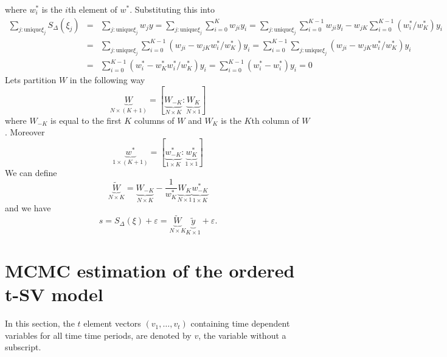 \documentclass[12pt]{article}
\begin{document}
where $w^{*}_{i}$ is the $i$th element of $w^{*}$. Substituting this into
\begin{eqnarray}
\sum \limits_{j : \text{unique} \xi_j} S_{\Delta}(\xi_j )&=&\sum \limits_{j : \text{unique} \xi_j} w_j y= \sum \limits_{j : \text{unique} \xi_j} \sum_{i=0}^{K} w_{ji}y_{i}  = \sum \limits_{j : \text{unique} \xi_j} \sum_{i=0}^{K-1} w_{ji}y_{i} -w_{jK} \sum \limits_{i=0}^{K-1} (w^{*}_{i}/w^{*}_{K})y_i \nonumber \\
&=&\sum \limits_{j : \text{unique} \xi_j} \sum_{i=0}^{K-1} (w_{ji}- w_{jK}w^{*}_{i}/w^{*}_{K})y_{i} =  \sum_{i=0}^{K-1} \sum \limits_{j : \text{unique} \xi_j} (w_{ji}- w_{jK}w^{*}_{i}/w^{*}_{K})y_{i}  \nonumber \\
&=&  \sum_{i=0}^{K-1}  (w^{*}_{i}- w^{*}_{K}w^{*}_{i}/w^{*}_{K})y_{i}= \sum_{i=0}^{K-1}  (w^{*}_{i}- w^{*}_{i})y_{i} =0
\end{eqnarray}
Lets partition $W$ in the following way 
\begin{equation}
\underbrace{W}_{N\times (K+1)} = [ \underbrace{W_{-K}}_{N\times K} : \underbrace{W_{K}}_{N\times 1} ]
\end{equation}
where $W_{-K}$ is equal to the first $K$ columns of $W$ and $W_K$ is the $K$th column of $W$. Moreover 
\begin{equation}
 \underbrace{w^{*}}_{1 \times (K+1)}=[\underbrace{w^{*}_{-K}}_{1\times K} : \underbrace{w^{*}_{K}}_{1\times 1} ] 
\end{equation}
We can define 
\begin{equation}
\underbrace{\widetilde{W}}_{N\times K}= \underbrace{W_{-K}}_{N\times K} - \frac{1}{w^{*}_{K} } \underbrace{W_K}_{N\times 1}  \underbrace{w^{*}_{-K}  }_{1\times K} 
\end{equation}
and we have
\begin{equation}
s=S_{\Delta}(\xi)+\varepsilon =\underbrace{\widetilde{W}}_{N\times K}\underbrace{\tilde{y}}_{K \times 1}+\varepsilon.
\end{equation}




\section{MCMC estimation of the ordered t-SV model}
\label{c_sec:tapp}

In this section,  the $t$ element vectors $(v_1, \ldots, v_t)$ containing time dependent variables for all time time periods, are denoted by $v$, the variable without a subscript.
\end{document}
